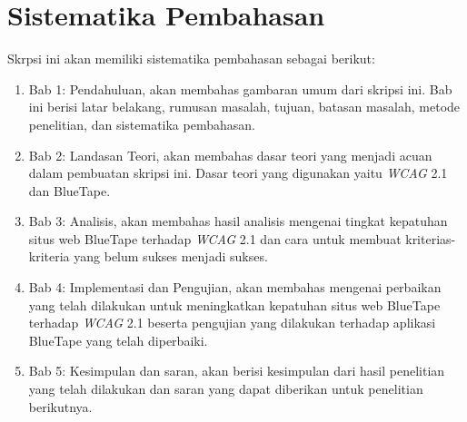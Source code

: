 \section{Sistematika Pembahasan}
\label{sec:sispem}
Skrpsi ini akan memiliki sistematika pembahasan sebagai berikut: 
\begin{enumerate}
	\item Bab 1: Pendahuluan, akan membahas gambaran umum dari skripsi ini. Bab ini berisi latar belakang, rumusan masalah, tujuan, batasan masalah, metode penelitian, dan sistematika pembahasan.
	\item Bab 2: Landasan Teori, akan membahas dasar teori yang menjadi acuan dalam pembuatan skripsi ini. Dasar teori yang digunakan yaitu \textit{WCAG} 2.1 dan BlueTape.
	\item Bab 3: Analisis, akan membahas hasil analisis mengenai tingkat kepatuhan situs web BlueTape terhadap \textit{WCAG} 2.1 dan cara untuk membuat kriterias-kriteria yang belum sukses menjadi sukses.
	\item Bab 4: Implementasi dan Pengujian, akan membahas mengenai perbaikan yang telah dilakukan untuk meningkatkan kepatuhan situs web BlueTape terhadap \textit{WCAG} 2.1 beserta pengujian yang dilakukan terhadap aplikasi BlueTape yang telah diperbaiki.
	\item Bab 5: Kesimpulan dan saran, akan berisi kesimpulan dari hasil penelitian yang telah dilakukan dan saran yang dapat diberikan untuk penelitian berikutnya.
\end{enumerate}
